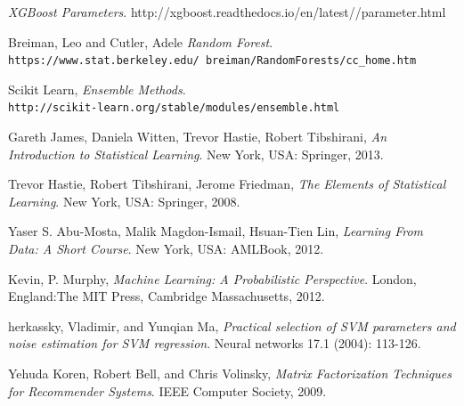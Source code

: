 \documentclass{article}
\begin{document}
\begin{spacing}{1}
\begin{large}
\begin{thebibliography}{9}
	\emph{XGBoost Parameters}.
	http://xgboost.readthedocs.io/en/latest//parameter.html

	Breiman, Leo and Cutler, Adele
	\textit{Random Forest}.
	\\\texttt{https://www.stat.berkeley.edu/~breiman/RandomForests/cc\_home.htm}

	Scikit Learn,
	\textit{Ensemble Methods}.
	\\\texttt{http://scikit-learn.org/stable/modules/ensemble.html}

	Gareth James, Daniela Witten, Trevor Hastie, Robert Tibshirani, \textit{An Introduction to Statistical Learning}. New York, USA: Springer, 2013.

	Trevor Hastie, Robert Tibshirani, Jerome Friedman, \textit{The Elements of Statistical Learning}. New York, USA: Springer, 2008.

	Yaser S. Abu-Mosta, Malik Magdon-Ismail, Hsuan-Tien Lin, \textit{Learning From Data: A Short Course}. New York, USA: AMLBook, 2012.

	Kevin, P. Murphy, \textit{Machine Learning: A Probabilistic Perspective}. London, England:The MIT Press, Cambridge Massachusetts, 2012.

	herkassky, Vladimir, and Yunqian Ma, \textit{Practical selection of SVM parameters and noise estimation for SVM regression}. Neural networks 17.1 (2004): 113-126.

	Yehuda Koren, Robert Bell, and  Chris Volinsky,
	\textit{Matrix Factorization Techniques for Recommender Systems}. IEEE Computer Society, 2009.
\end{thebibliography}

\end{large}
\end{spacing}
\end{document}
